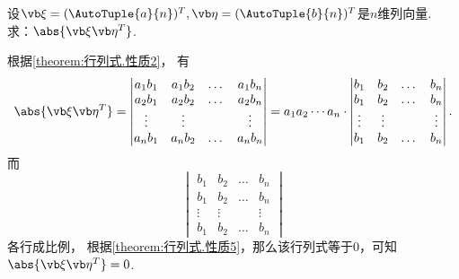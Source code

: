 \begin{example}\label{example:行列式.两个向量的乘积矩阵的行列式}
设\(\a=(\AutoTuple{a}{n})^T,\b=(\AutoTuple{b}{n})^T\)是\(n\)维列向量.
求：\(\abs{\a\b^T}\).
\begin{solution}
根据\cref{theorem:行列式.性质2}，
有\begin{align*}
	\abs{\a\b^T} = \begin{vmatrix}
		a_1 b_1 & a_1 b_2 & \dots & a_1 b_n \\
		a_2 b_1 & a_2 b_2 & \dots & a_2 b_n \\
		\vdots & \vdots & & \vdots \\
		a_n b_1 & a_n b_2 & \dots & a_n b_n
	\end{vmatrix}
	= a_1 a_2 \dotsm a_n \cdot \begin{vmatrix}
		b_1 & b_2 & \dots & b_n \\
		b_1 & b_2 & \dots & b_n \\
		\vdots & \vdots & & \vdots \\
		b_1 & b_2 & \dots & b_n
	\end{vmatrix}.
\end{align*}
而\[
\begin{vmatrix}
	b_1 & b_2 & \dots & b_n \\
	b_1 & b_2 & \dots & b_n \\
	\vdots & \vdots & & \vdots \\
	b_1 & b_2 & \dots & b_n
\end{vmatrix}
\]各行成比例，
根据\cref{theorem:行列式.性质5}，那么该行列式等于0，可知\(\abs{\a\b^T} = 0\).
\end{solution}
\end{example}
